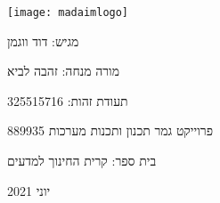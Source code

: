 \begin{titlepage}
  \centering
  \Huge\textbf{\projectname}\par
  \vspace{1cm}
  \Large
  
  {\texttt{[image: madaimlogo]} \par}
  {מגיש: דוד ווגמן \par}
  {מורה מנחה: זהבה לביא \par}
  {תעודת זהות: 325515716 \par}
  {פרוייקט גמר תכנון ותכנות מערכות 889935 \par}
  {בית ספר: קרית החינוך למדעים \par}
  {יוני 2021 \par}

\end{titlepage}